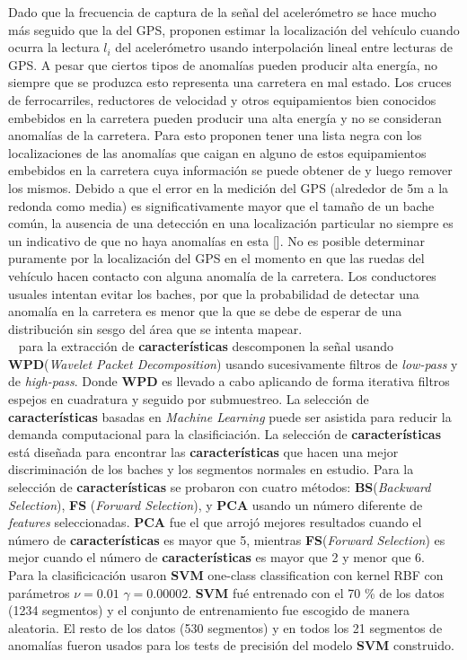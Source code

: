 		
			Dado que la frecuencia de captura de la señal del acelerómetro se hace mucho más seguido que la del GPS,
		proponen estimar la localización del vehículo cuando ocurra la lectura $l_i$ del acelerómetro usando interpolación lineal entre lecturas
		de GPS. A pesar que ciertos tipos de anomalías pueden producir alta energía, no siempre que se produzca esto representa una carretera en
		mal estado. Los cruces de ferrocarriles, reductores de velocidad y otros equipamientos bien conocidos embebidos en la carretera pueden
		producir una alta energía y no se consideran anomalías de la carretera. Para esto proponen tener una lista negra con los localizaciones
		de las anomalías que caigan en alguno de estos equipamientos embebidos en la carretera cuya información se puede obtener de y luego
		remover los mismos. Debido a que el error en la medición del GPS (alrededor de 5m a la redonda como media) es significativamente mayor
		que el tamaño de un bache común, la ausencia de una detección en una localización particular no siempre es un indicativo de que no haya
		anomalías en esta []. No es posible determinar puramente por la localización del GPS en el momento en que las ruedas del vehículo hacen
		contacto con alguna anomalía de la carretera. Los conductores usuales intentan evitar los baches, por que la probabilidad de detectar una
		anomalía en la carretera es menor que la que se debe de esperar de una distribución sin sesgo del área que se intenta mapear.\\

		~ para la extracción de \textbf{características} descomponen la señal usando \textbf{WPD}(\emph{Wavelet Packet Decomposition})
		usando sucesivamente filtros de \emph{low-pass} y de \emph{high-pass}. Donde \textbf{WPD} es llevado a cabo aplicando de forma iterativa filtros
		espejos en cuadratura y seguido por submuestreo. La selección de \textbf{características} basadas en \emph{Machine Learning} puede ser asistida para
		reducir la demanda computacional para la clasificiación. La selección de \textbf{características} está diseñada para encontrar las \textbf{características} que
		hacen una mejor discriminación de los baches y los segmentos normales en estudio. Para la selección de \textbf{características} se probaron con cuatro
		métodos: \textbf{BS}(\emph{Backward Selection}), \textbf{FS} (\emph{Forward Selection}),  y \textbf{PCA} usando un número diferente de \emph
		{features} seleccionadas. \textbf{PCA} fue el que arrojó mejores resultados cuando el número de \textbf{características} es mayor que 5, mientras \textbf
		{FS}(\emph{Forward Selection}) es mejor cuando el número de \textbf{características} es mayor que 2 y menor que 6.\\
		Para la clasificicación usaron \textbf{SVM} one-class classification con kernel RBF con parámetros  $\nu = 0.01$  $\gamma = 0.00002$. \textbf
		{SVM} fué entrenado con el 70 \%  de los datos (1234 segmentos) y el conjunto de entrenamiento fue escogido de manera aleatoria. El resto de
		los datos  (530 segmentos) y en todos los 21 segmentos de anomalías fueron usados para los tests de precisión del modelo \textbf{SVM} construido.\\


